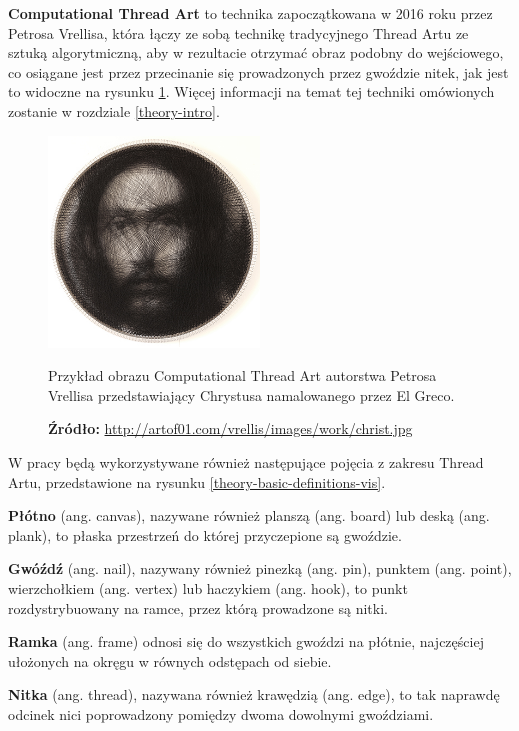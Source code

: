     \textbf{Computational Thread Art} to technika zapoczątkowana w 2016 roku przez Petrosa Vrellisa, która łączy ze sobą technikę tradycyjnego Thread Artu ze sztuką algorytmiczną, aby w rezultacie otrzymać obraz podobny do wejściowego, co osiągane jest przez przecinanie się prowadzonych przez gwoździe nitek, jak jest to widoczne na rysunku \ref{theory-computational-thread-art}. Więcej informacji na temat tej techniki omówionych zostanie w rozdziale \ref{theory-intro}.
    \begin{figure}[H]
        \centering
        \includegraphics[width=0.5\textwidth,keepaspectratio]{img/2-theory/christs.png}
        \caption[Przykład obrazu Computational Thread Art]{Przykład obrazu Computational Thread Art autorstwa Petrosa Vrellisa przedstawiający Chrystusa namalowanego przez El Greco.}
        \caption*{\footnotesize{\textbf{Źródło:} {\url{http://artof01.com/vrellis/images/work/christ.jpg}}}}
        \label{theory-computational-thread-art}
    \end{figure}
    
    W pracy będą wykorzystywane również następujące pojęcia z zakresu Thread Artu, przedstawione na rysunku \ref{theory-basic-definitions-vis}.
    
    \textbf{Płótno} (ang. canvas), nazywane również planszą (ang. board) lub deską (ang. plank), to płaska przestrzeń do której przyczepione są gwoździe. 
    
    \textbf{Gwóźdź} (ang. nail), nazywany również pinezką (ang. pin), punktem (ang. point), wierzchołkiem (ang. vertex) lub haczykiem (ang. hook), to punkt rozdystrybuowany na ramce, przez którą prowadzone są nitki.
    
    \textbf{Ramka} (ang. frame) odnosi się do wszystkich gwoździ na płótnie, najczęściej ułożonych na okręgu w równych odstępach od siebie.
    
    \textbf{Nitka} (ang. thread), nazywana również krawędzią (ang. edge), to tak naprawdę odcinek nici poprowadzony pomiędzy dwoma dowolnymi gwoździami.
    
